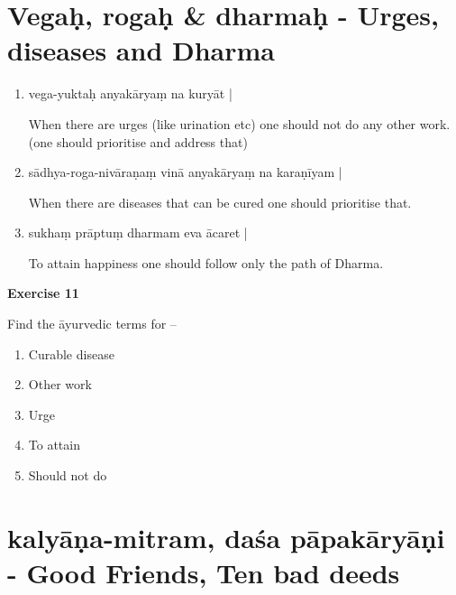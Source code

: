 \chapter{Vegaḥ, rogaḥ \& dharmaḥ - Urges, diseases and Dharma}

\begin{enumerate}
\item {}

vega-yuktaḥ anyakāryaṃ na kuryāt |

When there are urges (like urination etc) one should not do any other work. (one should prioritise and address that)

\item {}

sādhya-roga-nivāraṇaṃ vinā anyakāryaṃ na karaṇīyam | 

When there are diseases that can be cured one should prioritise that.

\item {}

sukhaṃ prāptuṃ dharmam eva ācaret | 

To attain happiness one should follow only  the path of Dharma.
\end{enumerate}

\begin{center}
\textbf{\large Exercise 11}
\end{center}

Find the āyurvedic terms for –
\begin{enumerate}
\renewcommand{\theenumi}{\alph{enumi}}
\renewcommand{\labelenumi}{\theenumi.}
\item Curable disease
\item Other work
\item Urge
\item To attain
\item Should not do
\end{enumerate}

\chapter{kalyāṇa-mitram, daśa pāpakāryāṇi - Good Friends, Ten bad deeds}

